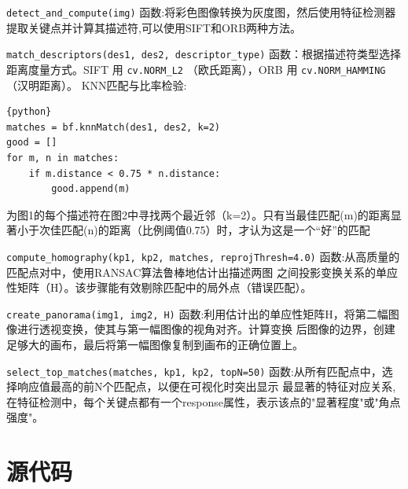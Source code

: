 \documentclass[12pt,a4paper]{article}     %
\begin{document}
\texttt{detect\_and\_compute(img)} 函数:将彩色图像转换为灰度图，然后使用特征检测器提取关键点并计算其描述符,可以使用SIFT和ORB两种方法。

\texttt{match\_descriptors(des1, des2, descriptor\_type)} 函数：根据描述符类型选择距离度量方式。SIFT 用 \texttt{cv.NORM\_L2}
（欧氏距离），ORB 用 \texttt{cv.NORM\_HAMMING}（汉明距离）。
KNN匹配与比率检验:
\begin{lstlisting}{python}
matches = bf.knnMatch(des1, des2, k=2)
good = []
for m, n in matches:
    if m.distance < 0.75 * n.distance:
        good.append(m)
\end{lstlisting}
为图1的每个描述符在图2中寻找两个最近邻（k=2）。只有当最佳匹配(m)的距离显著小于次佳匹配(n)的距离（比例阈值0.75）时，才认为这是一个“好”的匹配

\texttt{compute\_homography(kp1, kp2, matches, reprojThresh=4.0)} 函数:从高质量的匹配点对中，使用RANSAC算法鲁棒地估计出描述两图
之间投影变换关系的单应性矩阵（H）。该步骤能有效剔除匹配中的局外点（错误匹配）。

\texttt{create\_panorama(img1, img2, H)} 函数:利用估计出的单应性矩阵H，将第二幅图像进行透视变换，使其与第一幅图像的视角对齐。计算变换
后图像的边界，创建足够大的画布，最后将第一幅图像复制到画布的正确位置上。

\texttt{select\_top\_matches(matches, kp1, kp2, topN=50)} 函数:从所有匹配点中，选择响应值最高的前N个匹配点，以便在可视化时突出显示
最显著的特征对应关系,在特征检测中，每个关键点都有一个response属性，表示该点的"显著程度"或"角点强度"。

\section{源代码}
\end{document}

